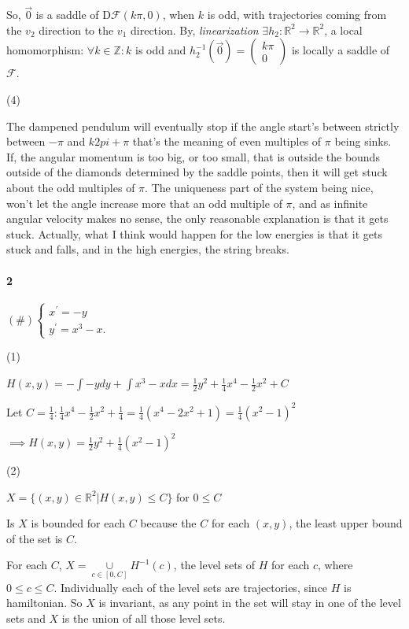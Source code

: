 \documentclass{article}
\begin{document}
So, $\vec{0}$ is a saddle of $\text{D}\mathcal{F}(k\pi,0)$, when $k$ is odd, with trajectories coming from the $v_2$ direction
to the $v_1$ direction. By, \textit{linearization} $\exists
h_2:\mathbb{R}^2\rightarrow \mathbb{R}^2$, a local homomorphism:
$\forall k\in \mathbb{Z}: k$ is odd and $ h_2^{-1}(\vec{0}) = \begin{pmatrix}
  k\pi\\ 0\end{pmatrix}$ is locally a saddle of $\mathcal{F}$.

(4)

The dampened pendulum will eventually stop if the angle start's
between strictly between $-\pi$ and $k2pi +\pi$ that's the meaning of
even multiples of $\pi$ being sinks. If, the angular momentum is too big, or too small, that is
outside the bounds outside of the diamonds determined by the saddle points,
then it will get stuck about the odd multiples of $\pi$. The uniqueness part of
the system being nice, won't let the angle increase more that an odd
multiple of $\pi$, and as infinite angular velocity makes no sense,
the only reasonable explanation is that it gets stuck. Actually, what
I think would happen for the low energies is that it gets stuck and
falls, and in the high energies, the string breaks.
\newpage
\paragraph{2}

$(\#)
\begin{cases}
x^\prime = −y\\
y^\prime = x^3 − x.
\end{cases}
$

(1)

$H(x,y) = -\int -y dy + \int x^3-x dx = \frac{1}{2}y^2
+\frac{1}{4}x^4 -\frac{1}{2}x^2 + C$

Let $ C= \frac{1}{4}:
\frac{1}{4}x^4 -\frac{1}{2}x^2 + \frac{1}{4} =
\frac{1}{4}(x^4 -2x^2 + 1) =
\frac{1}{4}(x^2 -1)^2$

$\implies H(x,y) = \frac{1}{2}y^2 +\frac{1}{4}(x^2 -1)^2$

(2)

$X = \{(x, y) \in \mathbb{R}^2 | H(x, y) \leq C\}$ for $0\leq C$

Is $X$ is bounded for each $C$ because the $C$ for each $(x,y)$, the least
upper bound of the set is $C$.

For each $C$, $X = \cup\limits_{c\in [0, C]}
H^{-1}(c)$, the level sets of $H$ for each $c$, where $0 \leq c \leq C$.
Individually each of the level sets are trajectories, since $H$ is hamiltonian. So $X$ is
invariant, as any point in the set will stay in one of the level sets
and $X$ is the union of all those level sets.
\end{document}
